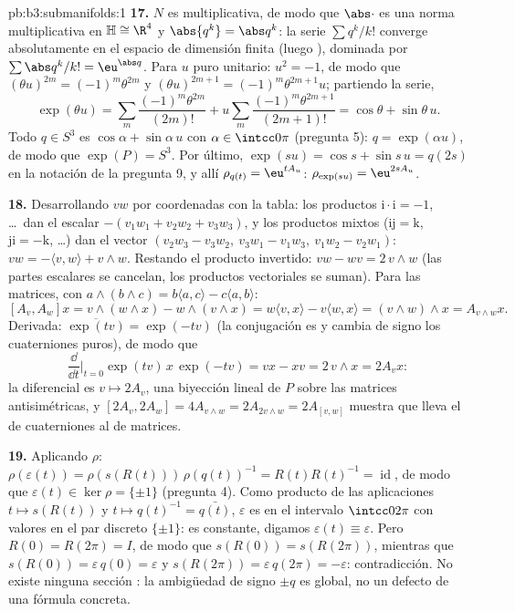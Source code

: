 \begin{solution}{pb:b3:submanifolds:1}
\textbf{17.} $N$ es multiplicativa, de modo que $\abs\cdot$ es una norma
multiplicativa en $\mathbb H \cong \R^4$ y $\abs{q^k} = \abs q^k$: la
serie $\sum q^k/k!$ converge absolutamente en el espacio de dimensión
finita (luego ), dominada por
$\sum\abs q^k/k! = \eu^{\abs q}$. Para $u$ puro unitario: $u^2 = -1$, de
modo que $(\theta u)^{2m} =
(-1)^m\theta^{2m}$ y $(\theta u)^{2m+1} =
(-1)^m\theta^{2m+1}u$; partiendo la serie,
\[
\exp(\theta u) = \sum_m\frac{(-1)^m\theta^{2m}}{(2m)!} +
u\sum_m\frac{(-1)^m\theta^{2m+1}}{(2m+1)!} = \cos\theta +
\sin\theta\,u .
\]
Todo $q \in S^3$ es $\cos\alpha + \sin\alpha\,u$ con
$\alpha \in \intcc0\pi$ (pregunta 5): $q = \exp(\alpha u)$, de modo que
$\exp(P) = S^3$. Por último, $\exp(su) = \cos s + \sin s\,u
= q(2s)$ en la notación de la pregunta 9, y allí $\rho_{q(t)} =
\eu^{tA_u}$: $\rho_{\exp(su)} = \eu^{2sA_u}$.

\textbf{18.} Desarrollando $vw$ por coordenadas con la tabla: los
productos $\mathrm i\cdot\mathrm i = -1$, \dots\ dan el escalar
$-(v_1w_1 + v_2w_2 + v_3w_3)$, y los productos mixtos
($\mathrm{ij} = \mathrm k$, $\mathrm{ji} =
-\mathrm k$, \dots) dan el vector $(v_2w_3 - v_3w_2,\
v_3w_1 - v_1w_3,\ v_1w_2 - v_2w_1)$: $vw = -\langle v,
w\rangle + v\wedge w$. Restando el producto invertido:
$vw - wv = 2\,v\wedge w$ (las partes escalares se cancelan, los
productos vectoriales se suman). Para las matrices, con $a\wedge(b\wedge
c) = b\langle a, c\rangle - c\langle a, b\rangle$:
\[
[A_v, A_w]x = v\wedge(w\wedge x) - w\wedge(v\wedge x)
= w\langle v, x\rangle - v\langle w, x\rangle
= (v\wedge w)\wedge x = A_{v\wedge w}x .
\]
Derivada: $\overline{\exp(tv)} = \exp(-tv)$ (la conjugación es
 y cambia de signo los
cuaterniones puros), de modo que
\[
\frac{\dd}{\dd t}\Bigr|_{t=0}\exp(tv)\,x\,\exp(-tv) = vx -
xv = 2\,v\wedge x = 2A_vx :
\]
la diferencial es $v \mapsto 2A_v$, una biyección lineal de $P$ sobre
las matrices antisimétricas, y $[2A_v, 2A_w]
= 4A_{v\wedge w} = 2A_{2v\wedge w} = 2A_{[v,w]}$ muestra que lleva el
 de cuaterniones al
\omterm{def:b3:groups:derived}{conmutador} de matrices.

\textbf{19.} Aplicando $\rho$: $\rho(\varepsilon(t)) =
\rho(s(R(t)))\,\rho(q(t))^{-1} = R(t)R(t)^{-1} =
\operatorname{id}$, de modo que $\varepsilon(t) \in \ker\rho =
\{\pm1\}$ (pregunta 4). Como producto de las
aplicaciones 
$t \mapsto s(R(t))$ y $t \mapsto q(t)^{-1} =
\bar{q(t)}$, $\varepsilon$ es
 en el intervalo
 $\intcc0{2\pi}$ con valores
en el par discreto $\{\pm1\}$: es constante, digamos
$\varepsilon(t) \equiv
\varepsilon$. Pero $R(0) = R(2\pi) = I$, de modo que $s(R(0)) =
s(R(2\pi))$, mientras que $s(R(0)) = \varepsilon\,q(0) =
\varepsilon$ y $s(R(2\pi)) = \varepsilon\,q(2\pi) =
-\varepsilon$: contradicción. No existe ninguna sección
: la ambigüedad de signo
$\pm q$ es global, no un defecto de una fórmula concreta.


\end{solution}
